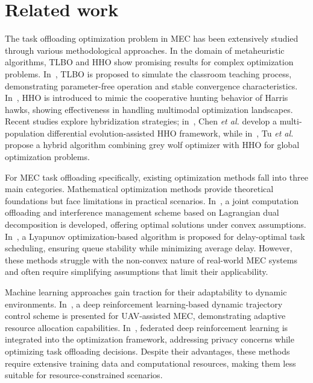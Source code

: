 \documentclass[conference]{IEEEtran}
\begin{document}
\section{Related work}

The task offloading optimization problem in MEC has been extensively studied through various methodological approaches. In the domain of metaheuristic algorithms, TLBO and HHO show promising results for complex optimization problems. In~\cite{rao2011teaching}, TLBO is proposed to simulate the classroom teaching process, demonstrating parameter-free operation and stable convergence characteristics. In~\cite{heidari2019harris}, HHO is introduced to mimic the cooperative hunting behavior of Harris hawks, showing effectiveness in handling multimodal optimization landscapes. Recent studies explore hybridization strategies; in~\cite{chen2020multi}, Chen \textit{et al.} develop a multi-population differential evolution-assisted HHO framework, while in~\cite{tu2023hybrid}, Tu \textit{et al.} propose a hybrid algorithm combining grey wolf optimizer with HHO for global optimization problems.

For MEC task offloading specifically, existing optimization methods fall into three main categories. Mathematical optimization methods provide theoretical foundations but face limitations in practical scenarios. In~\cite{wang2017joint}, a joint computation offloading and interference management scheme based on Lagrangian dual decomposition is developed, offering optimal solutions under convex assumptions. In~\cite{liu2016delay}, a Lyapunov optimization-based algorithm is proposed for delay-optimal task scheduling, ensuring queue stability while minimizing average delay. However, these methods struggle with the non-convex nature of real-world MEC systems and often require simplifying assumptions that limit their applicability.

Machine learning approaches gain traction for their adaptability to dynamic environments. In~\cite{wang2021deep}, a deep reinforcement learning-based dynamic trajectory control scheme is presented for UAV-assisted MEC, demonstrating adaptive resource allocation capabilities. In~\cite{zang2022federated}, federated deep reinforcement learning is integrated into the optimization framework, addressing privacy concerns while optimizing task offloading decisions. Despite their advantages, these methods require extensive training data and computational resources, making them less suitable for resource-constrained scenarios.
\end{document}
